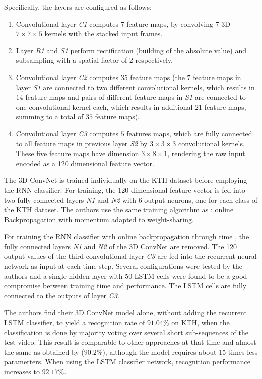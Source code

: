 Specifically, the layers are configured as follows:
\begin{enumerate}
    \item Convolutional layer \textit{C1} computes $7$ feature maps, by convolving $7$ 3D $7\times7\times5$ kernels with the stacked input frames.
    \item Layer \textit{R1} and \textit{S1} perform rectification (building of the absolute value) and subsampling with a spatial factor of 2 respectively.
    \item Convolutional layer \textit{C2} computes $35$ feature maps (the $7$ feature maps in layer \textit{S1} are connected to two different convolutional kernels, which results in $14$ feature maps and pairs of different feature maps in \textit{S1} are connected to one convolutional kernel each, which results in additional $21$ feature maps, summing to a total of $35$ feature maps).
    \item Convolutional layer \textit{C3} computes $5$ features maps, which are fully connected to all feature maps in previous layer \textit{S2} by $3\times3\times3$ convolutional kernels. These five feature maps have dimension $3\times8\times1$, rendering the raw input encoded as a 120 dimensional feature vector.
\end{enumerate}

The 3D ConvNet is trained individually on the KTH dataset before employing the RNN classifier.
For training, the 120 dimensional feature vector is fed into two fully connected layers \textit{N1} and \textit{N2} with 6 output neurons, one for each class of the KTH dataset.
The authors use the same training algorithm as \textcite{ji_3d_2013}: online Backpropagation with momentum adapted to weight-sharing.

For training the RNN classifier with online backpropagation through time \cite{gers_learning_2002}, the fully connected layers \textit{N1} and \textit{N2} of the 3D ConvNet are removed.
The 120 output values of the third convolutional layer \textit{C3} are fed into the recurrent neural network as input at each time step.
Several configurations were tested by the authors and a single hidden layer with 50 LSTM cells were found to be a good compromise between training time and performance.
The LSTM cells are fully connected to the outputs of layer \textit{C3}.

The authors find their 3D ConvNet model alone, without adding the recurrent LSTM classifier, to yield a recognition rate of $91.04\%$ on KTH, when the classification is done by majority voting over several short sub-sequences of the test-video.
This result is comparable to other approaches at that time and almost the same as obtained by \textcite{ji_3d_2013} ($90.2\%$), although the model requires about 15 times less paramerters.
When using the LSTM classifier network, recognition performance increases to $92.17\%$.


